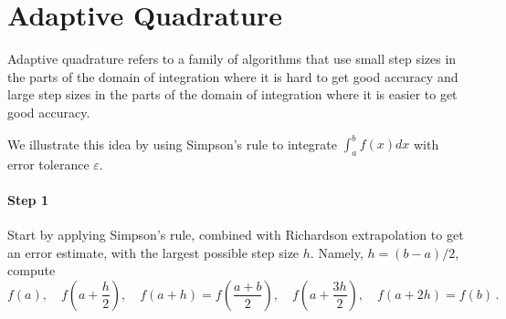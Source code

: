 \section{Adaptive Quadrature}
Adaptive quadrature refers to a family of algorithms that use small step sizes in the parts of the domain of integration where it is hard to get good accuracy and large step sizes in the parts of the domain of integration where it is easier to get good accuracy.

We illustrate this idea by using Simpson's rule to integrate $\int_{a}^b f(x)dx$ with error tolerance $\varepsilon$. 

\paragraph{Step 1} Start by applying Simpson's rule, combined with Richardson extrapolation to get an error estimate, with the largest possible step size $h$. Namely, $h= (b-a)/2$, compute
\begin{equation}
    f(a), \quad f\left(a+\frac{h}{2}\right), \quad f(a+h) = f\left(\frac{a+b}{2}\right), \quad f\left(a+\frac{3h}{2}\right), \quad f(a+2h) = f(b)\,.
\end{equation}
